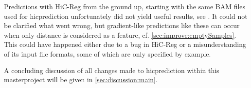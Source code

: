 Predictions with HiC-Reg from the ground up, starting with the same BAM files used for hicprediction
unfortunately did not yield useful results, see \xxx.
It could not be clarified what went wrong, 
but gradient-like predictions like these can occur when only distance is
considered as a feature, cf. \autoref{sec:improve:emptySamples}.
This could have happened either due to a bug in HiC-Reg 
or a misunderstanding of its input file formats, some of which are 
only specified by example.

A concluding discussion of all changes made to hicprediction within this masterproject
will be given in \autoref{sec:discussion:main}.